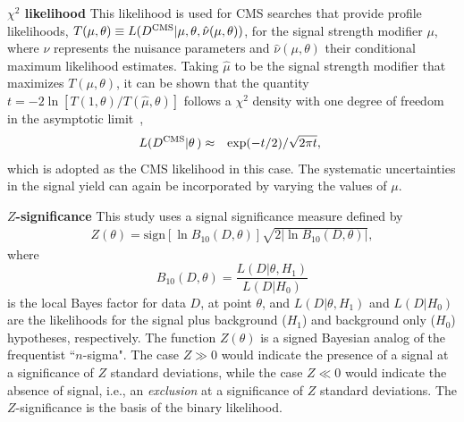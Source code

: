 \textbf{$\chi^2$ likelihood}
This likelihood is used for CMS searches that provide profile
likelihoods, $T(\mu,\theta) \equiv
L(D^{\text{CMS}}|\mu,\theta,\hat\nu(\mu,\theta))$, for the signal strength
modifier $\mu$, where $\nu$ represents the nuisance parameters and
$\hat\nu(\mu,\theta)$ their conditional maximum likelihood
estimates. Taking $\hat\mu$ to be the signal strength modifier that
maximizes $T(\mu,\theta)$, it can be shown that the quantity $t =
-2\ln\left[T(1,\theta)/T(\hat\mu,\theta)\right]$ follows a $\chi^2$
density with one degree of freedom in the
asymptotic limit~\cite{Wilks:1938dza},
\begin{eqnarray}
L(D^{\text{CMS}}|\theta\,) & \approx &\exp(-t/2) / \sqrt{2\pi t}, 
  ~\label{eq:lhd_chi2}
\end{eqnarray}
which is adopted as the CMS likelihood in this case. The systematic uncertainties in the signal yield can again be incorporated by varying the values of $\mu$.

\textbf{$Z$-significance}
This study uses a signal significance measure defined by 
\begin{align}
  Z(\theta) = \textrm{sign} [\ln B_{10}(D, \theta )] \sqrt{2 | \ln B_{10}(D, \theta )|} ,
  \label{eq:Zsingle}
\end{align}
where 
\begin{equation}
  B_{10}(D, \theta) = \frac{L(D | \theta, H_1)}{L(D | H_0)} 
  \label{eq:B10}
\end{equation}
is the local Bayes factor for data $D$, at point $\theta$, and $L(D | \theta, H_1)$ and $L(D  | H_0)$
are the likelihoods for the signal plus background ($H_1$) and background only ($H_0$) hypotheses, respectively.  The function $Z(\theta)$ is a signed Bayesian analog of the frequentist ``$n$-sigma".
The case $Z \gg 0$ would indicate the presence of a signal 
at a significance of $Z$ standard deviations, while the case $Z \ll 0$ would indicate the absence of signal, i.e., an \emph{exclusion} at a significance of $Z$ standard deviations.  The $Z$-significance is the basis of the binary likelihood.

